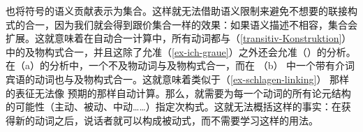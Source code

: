  \citet{KF99a} 也将符号的语义贡献表示为集合。这样就无法借助语义限制来避免不想要的联接构式的合一，因为我们就会得到跟价集合一样的效果：如果语义描述不相容，集合会扩展。这就意味着在自动合一计算中，所有动词都与（\ref{transitiv-Konstruktion}）中的及物构式合一，并且这除了允准（\ref{ex-ich-graue}）之外还会允准（）的分析。
\eal
{}
\zl
在（a）的分析中，一个不及物动词与及物构式合一，而在 （b） 中一个带有介词宾语的动词也与及物构式合一。这就意味着类似于（\ref{ex-schlagen-linking}） 那样的表征无法像 \citet{Kay2002a}预期的那样自动计算。那么，就需要为每一个动词的所有论元结构的可能性（主动、被动、中动……）指定次构式。这就无法概括这样的事实：在获得新的动词之后，说话者就可以构成被动式，而不需要学习这样的用法。%
%


